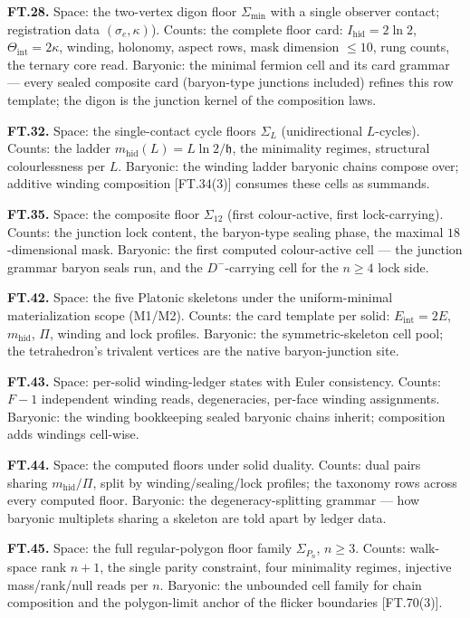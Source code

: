 \textbf{FT.28.} Space: the two-vertex digon floor $\Sigma_{\min}$ with a single observer contact; registration data $(\sigma_e,\kappa)$). Counts: the complete floor card: $I_{\mathrm{hid}}=2\ln2$, $\Theta_{\mathrm{int}}=2\kappa$, winding, holonomy, aspect rows, mask dimension $\le10$, rung counts, the ternary core read. Baryonic: the minimal fermion cell and its card grammar — every sealed composite card (baryon-type junctions included) refines this row template; the digon is the junction kernel of the composition laws.

\textbf{FT.32.} Space: the single-contact cycle floors $\Sigma_L$ (unidirectional $L$-cycles). Counts: the ladder $m_{\mathrm{hid}}(L)=L\ln2/\mathfrak h$, the minimality regimes, structural colourlessness per $L$. Baryonic: the winding ladder baryonic chains compose over; additive winding composition [FT.34(3)] consumes these cells as summands.

\textbf{FT.35.} Space: the composite floor $\Sigma_{12}$ (first colour-active, first lock-carrying). Counts: the junction lock content, the baryon-type sealing phase, the maximal $18$-dimensional mask. Baryonic: the first computed colour-active cell — the junction grammar baryon seals run, and the $D^-$-carrying cell for the $n\ge4$ lock side.

\textbf{FT.42.} Space: the five Platonic skeletons under the uniform-minimal materialization scope (M1/M2). Counts: the card template per solid: $E_{\mathrm{int}}=2E$, $m_{\mathrm{hid}}$, $\Pi$, winding and lock profiles. Baryonic: the symmetric-skeleton cell pool; the tetrahedron's trivalent vertices are the native baryon-junction site.

\textbf{FT.43.} Space: per-solid winding-ledger states with Euler consistency. Counts: $F-1$ independent winding reads, degeneracies, per-face winding assignments. Baryonic: the winding bookkeeping sealed baryonic chains inherit; composition adds windings cell-wise.

\textbf{FT.44.} Space: the computed floors under solid duality. Counts: dual pairs sharing $m_{\mathrm{hid}}/\Pi$, split by winding/sealing/lock profiles; the taxonomy rows across every computed floor. Baryonic: the degeneracy-splitting grammar — how baryonic multiplets sharing a skeleton are told apart by ledger data.

\textbf{FT.45.} Space: the full regular-polygon floor family $\Sigma_{P_n}$, $n\ge3$. Counts: walk-space rank $n+1$, the single parity constraint, four minimality regimes, injective mass/rank/null reads per $n$. Baryonic: the unbounded cell family for chain composition and the polygon-limit anchor of the flicker boundaries [FT.70(3)].

